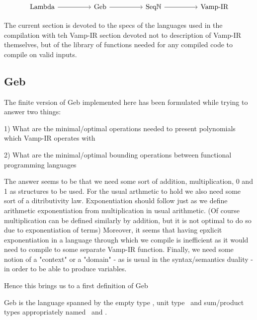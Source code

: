 \[\begin{tikzcd}
	{\text{Lambda}} && {\text{Geb}} && {\text{Seq$\N$} } && {\text{Vamp-IR}}
	\arrow[from=1-1, to=1-3]
	\arrow[from=1-3, to=1-5]
	\arrow[from=1-5, to=1-7]
\end{tikzcd}\]

The current section is devoted to the specs of the languages used in the compilation with teh Vamp-IR section devoted not to description of Vamp-IR themselves, but of the library of functions needed for any compiled code to compile on valid inputs. 

\subsection{Geb}

The finite version of Geb implemented here has been formulated while trying to answer two things: 

1) What are the minimal/optimal operations needed to present polynomials which Vamp-IR operates with

2) What are the minimal/optimal bounding operations between functional programming languages

The answer seems to be that we need some sort of addition, multiplication, 0 and 1 as structures to be used. For the usual arthmetic to hold we also need some sort of a ditributivity law. Exponentiation should follow just as we define arithmetic exponentiation from multiplication in usual arithmetic. (Of course multiplication can be defined similarly by addition, but it is not optimal to do so due to exponentiation of terms) Moreover, it seems that having epxlicit exponentiation in a language through which we compile is inefficient as it would need to compile to some separate Vamp-IR function. Finally, we need some notion of a "context" or a "domain" - as is usual in the syntax/semantics duality - in order to be able to produce variables.

Hence this brings us to a first definition of Geb

\begin{definition}
Geb is the language spanned by the empty type , unit type \gebterm \, and sum/product types appropriately named \gebcoprod \,  and \gebprod.
\end{definition}

